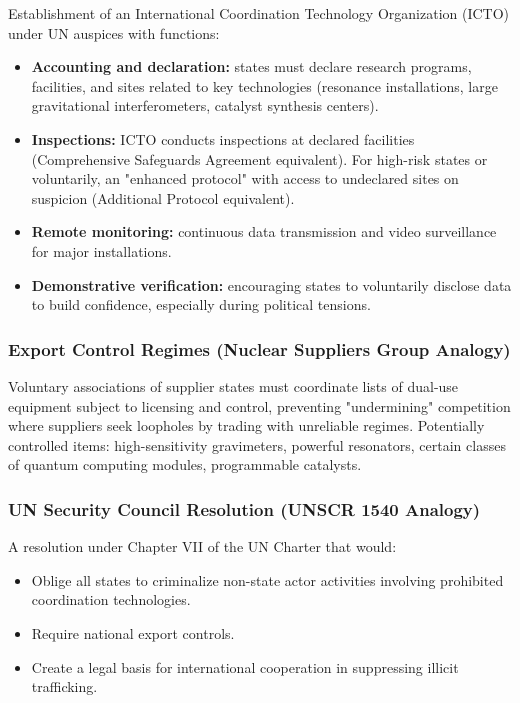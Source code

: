 \documentclass[12pt,a4paper]{article}
\theoremstyle{remark}
\begin{document}
	Establishment of an International Coordination Technology Organization (ICTO) under UN auspices with functions:
	\begin{itemize}
		\item \textbf{Accounting and declaration:} states must declare research programs, facilities, and sites related to key technologies (resonance installations, large gravitational interferometers, catalyst synthesis centers).
		\item \textbf{Inspections:} ICTO conducts inspections at declared facilities (Comprehensive Safeguards Agreement equivalent). For high-risk states or voluntarily, an "enhanced protocol" with access to undeclared sites on suspicion (Additional Protocol equivalent).
		\item \textbf{Remote monitoring:} continuous data transmission and video surveillance for major installations.
		\item \textbf{Demonstrative verification:} encouraging states to voluntarily disclose data to build confidence, especially during political tensions.
	\end{itemize}
	
	\subsubsection{Export Control Regimes (Nuclear Suppliers Group Analogy)}
	
	Voluntary associations of supplier states must coordinate lists of dual-use equipment subject to licensing and control, preventing "undermining" competition where suppliers seek loopholes by trading with unreliable regimes. Potentially controlled items: high-sensitivity gravimeters, powerful resonators, certain classes of quantum computing modules, programmable catalysts.
	
	\subsubsection{UN Security Council Resolution (UNSCR 1540 Analogy)}
	
	A resolution under Chapter VII of the UN Charter that would:
	\begin{itemize}
		\item Oblige all states to criminalize non-state actor activities involving prohibited coordination technologies.
		\item Require national export controls.
		\item Create a legal basis for international cooperation in suppressing illicit trafficking.
	\end{itemize}
	
\end{document}

